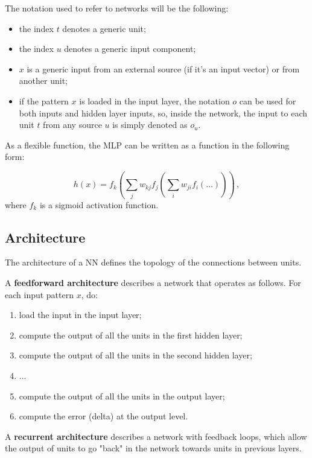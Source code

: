 The notation used to refer to networks will be the following:

\begin{itemize}
    \item the index $t$ denotes a generic unit;

    \item the index $u$ denotes a generic input component;

    \item $x$ is a generic input from an external source (if it's an input vector) or from another unit;

    \item if the pattern $x$ is loaded in the input layer, the notation $o$ can be used for both inputs and hidden layer inputs, so, inside the network, the input to each unit $t$ from any source $u$ is simply denoted as $o_u$.
\end{itemize}


As a flexible function, the MLP can be written as a function in the following form:

\begin{equation*}
    h(x) = f_k(\sum_j w_{kj} f_j (\sum_i w_{ji} f_i(\dots))) \, ,
\end{equation*}
where $f_k$ is a sigmoid activation function.

\subsection{Architecture}

The architecture of a NN defines the topology of the connections between units.

A \textbf{feedforward architecture} describes a network that operates as follows. For each input pattern $x$, do:

\begin{enumerate}
    \item load the input in the input layer;
    \item compute the output of all the units in the first hidden layer;
    \item compute the output of all the units in the second hidden layer;
    \item ...
    \item compute the output of all the units in the output layer;
    \item compute the error (delta) at the output level.
\end{enumerate}

A \textbf{recurrent architecture} describes a network with feedback loops, which allow the output of units to go "back" in the network towards units in previous layers.

